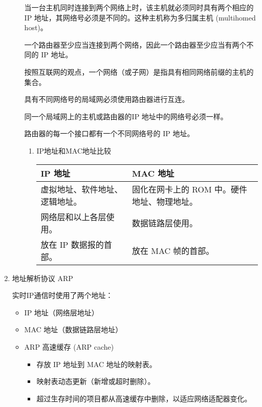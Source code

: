 \documentclass[11pt]{article}
\begin{document}
\begin{enumerate}
\begin{enumerate}
当一台主机同时连接到两个网络上时，该主机就必须同时具有两个相应的 IP 地址，其网络号必须是不同的。这种主机称为多归属主机 (multihomed host)。

一个路由器至少应当连接到两个网络，因此一个路由器至少应当有两个不同的 IP 地址。

按照互联网的观点，一个网络（或子网）是指具有相同网络前缀的主机的集合。

具有不同网络号的局域网必须使用路由器进行互连。

同一个局域网上的主机或路由器的IP 地址中的网络号必须一样。

路由器的每一个接口都有一个不同网络号的 IP 地址。
\begin{enumerate}
\item IP地址和MAC地址比较
\label{sec:org9e9e7e9}
\begin{center}
\begin{tabular}{ll}
IP 地址 & MAC 地址\\
\hline
虚拟地址、软件地址、逻辑地址。 & 固化在网卡上的 ROM 中。硬件地址、物理地址。\\
网络层和以上各层使用。 & 数据链路层使用。\\
放在 IP 数据报的首部。 & 放在 MAC 帧的首部。\\
\end{tabular}
\end{center}
\end{enumerate}
\end{enumerate}
\item 地址解析协议 ARP
\label{sec:orgb61c29a}

实时IP通信时使用了两个地址：
\begin{itemize}
\item IP 地址（网络层地址）
\item MAC 地址（数据链路层地址）
\end{itemize}


\begin{itemize}
\item ARP 高速缓存 (ARP cache)

\begin{itemize}
\item 存放 IP 地址到 MAC 地址的映射表。

\item 映射表动态更新（新增或超时删除）。

\item 超过生存时间的项目都从高速缓存中删除，以适应网络适配器变化。
\end{itemize}


\end{itemize}
\end{enumerate}
\end{document}

